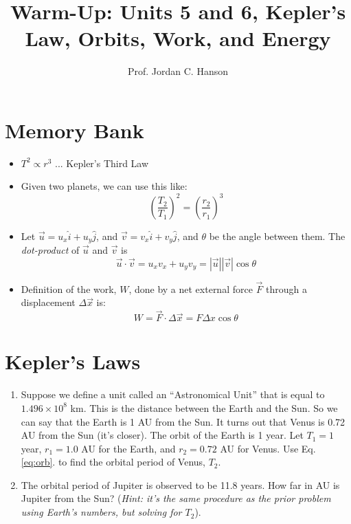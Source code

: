 \documentclass{article}
\begin{document}
\title{Warm-Up: Units 5 and 6, Kepler's Law, Orbits, Work, and Energy}
\author{Prof. Jordan C. Hanson}

\maketitle

\section{Memory Bank}

\begin{itemize}
\item $T^2 \propto r^3$ ... Kepler's Third Law
\item Given two planets, we can use this like:
\begin{equation}
\left(\frac{T_2}{T_1}\right)^2 = \left(\frac{r_2}{r_1}\right)^3 \label{eq:orb}
\end{equation}
\item Let $\vec{u} = u_x \hat{i} + u_y \hat{j}$, and $\vec{v} = v_x \hat{i} + v_y \hat{j}$, and $\theta$ be the angle between them.  The \textit{dot-product} of $\vec{u}$ and $\vec{v}$ is
\begin{equation}
\vec{u} \cdot \vec{v} = u_x v_x + u_y v_y = |\vec{u}||\vec{v}|\cos\theta
\end{equation}
\item Definition of the work, $W$, done by a net external force $\vec{F}$ through a displacement $\Delta\vec{x}$ is:
\begin{equation}
W = \vec{F} \cdot \Delta \vec{x} = F \Delta x \cos\theta
\end{equation}
\end{itemize}

\section{Kepler's Laws}

\begin{enumerate}
\item Suppose we define a unit called an ``Astronomical Unit'' that is equal to $1.496\times 10^8$ km.  This is the distance between the Earth and the Sun.  So we can say that the Earth is 1 AU from the Sun.  It turns out that Venus is 0.72 AU from the Sun (it's closer).  The orbit of the Earth is 1 year.  Let $T_1 = 1$ year, $r_1 = 1.0$ AU for the Earth, and $r_2 = 0.72$ AU for Venus.  Use Eq. \ref{eq:orb}. to find the orbital period of Venus, $T_2$. \\ \vspace{1cm}
\item The orbital period of Jupiter is observed to be 11.8 years.  How far in AU is Jupiter from the Sun?  (\textit{Hint: it's the same procedure as the prior problem using Earth's numbers, but solving for $T_2$}). \\ \vspace{1cm}
\end{enumerate}
\end{document}
